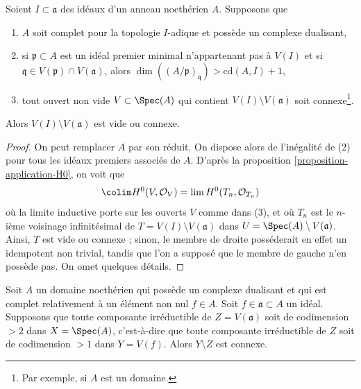 \begin{lemma}
\label{lemma-connected}
Soient $I \subset \mathfrak a$ des idéaux d'un anneau noethérien $A$.
Supposons que
\begin{enumerate}
\item $A$ soit complet pour la topologie $I$-adique et possède un complexe dualisant,
\item si $\mathfrak p \subset A$ est un idéal premier minimal n'appartenant pas
à $V(I)$ et si $\mathfrak q \in V(\mathfrak p) \cap V(\mathfrak a)$, alors
$\dim((A/\mathfrak p)_\mathfrak q) > \text{cd}(A, I) + 1$,
\item tout ouvert non vide $V \subset \Spec(A)$ qui contient
$V(I) \setminus V(\mathfrak a)$ soit connexe\footnote{Par exemple,
si $A$ est un domaine.}.
\end{enumerate}
Alors $V(I) \setminus V(\mathfrak a)$ est vide ou connexe.
\end{lemma}

\begin{proof}
On peut remplacer $A$ par son réduit. On dispose alors de l'inégalité
de (2) pour tous les idéaux premiers associés de $A$. D'après la
proposition \ref{proposition-application-H0}, on voit que
$$
\colim H^0(V, \mathcal{O}_V) = \lim H^0(T_n, \mathcal{O}_{T_n})
$$
où la limite inductive porte sur les ouverts $V$ comme dans (3), et où $T_n$ est le
$n$-ième voisinage infinitésimal de $T = V(I) \setminus V(\mathfrak a)$
dans $U = \Spec(A) \setminus V(\mathfrak a)$. Ainsi, $T$ est vide
ou connexe ; sinon, le membre de droite posséderait en effet un
idempotent non trivial, tandis que l'on a supposé que le membre de gauche n'en possède pas.
On omet quelques détails.
\end{proof}

\begin{lemma}
\label{lemma-H0}
Soit $A$ un domaine noethérien qui possède un complexe dualisant
et qui est complet relativement à un élément non nul $f \in A$.
Soit $f \in \mathfrak a \subset A$ un idéal.
Supposons que toute composante irréductible de $Z = V(\mathfrak a)$
soit de codimension $> 2$ dans $X = \Spec(A)$, c'est-à-dire que toute
composante irréductible de $Z$ soit de codimension $> 1$ dans $Y = V(f)$.
Alors $Y \setminus Z$ est connexe.
\end{lemma}

